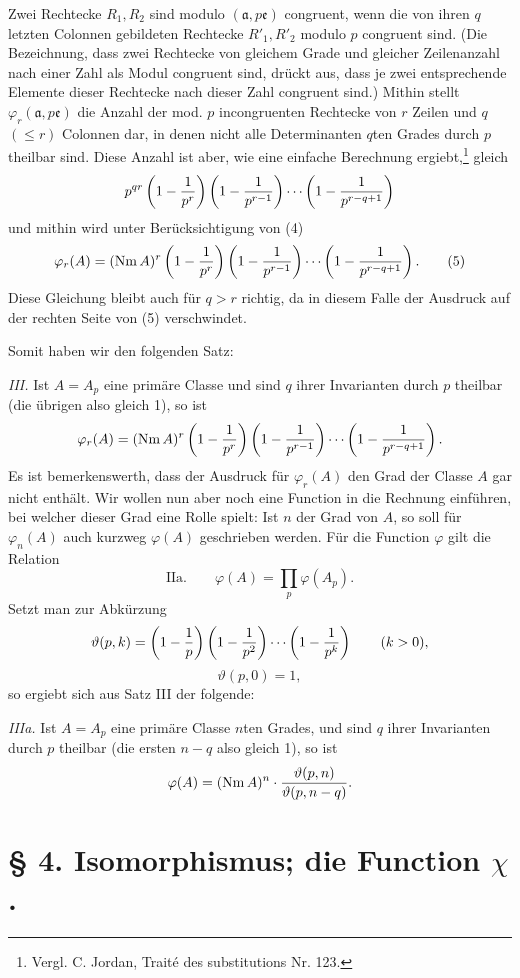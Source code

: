 \documentclass[11pt,a4paper]{article}
\newcommand{\Nm}{\operatorname{Nm}}
\newcommand{\tht}{\vartheta}
\begin{document}
Zwei Rechtecke $R_1,R_2$ sind modulo $(\mathfrak a,p\mathfrak e)$ congruent, wenn die von ihren $q$ letzten Colonnen gebildeten Rechtecke $R'_1,R'_2$ modulo $p$ congruent sind. (Die Bezeichnung, dass zwei Rechtecke von gleichem Grade und gleicher Zeilenanzahl nach einer Zahl als Modul congruent sind, drückt aus, dass je zwei entsprechende Elemente dieser Rechtecke nach dieser Zahl congruent sind.) Mithin stellt $\varphi_r(\mathfrak a,p\mathfrak e)$ die Anzahl der mod. $p$ incongruenten Rechtecke von $r$ Zeilen und $q$ $(\le r)$ Colonnen dar, in denen nicht alle Determinanten $q$ten Grades durch $p$ theilbar sind. Diese Anzahl ist aber, wie eine einfache Berechnung ergiebt,\footnote{Vergl. C. Jordan, Traité des substitutions Nr. 123.} gleich
\[
 p^{qr}\left(1-{1\over p^r}\right)
 \left(1-{1\over p^{r-1}}\right)
 \cdots
 \left(1-{1\over p^{r-q+1}}\right)
\]
und mithin wird unter Berücksichtigung von (4)
\begin{equation}
 \varphi_r(A)=(\Nm A)^r
 \left(1-{1\over p^r}\right)
 \left(1-{1\over p^{r-1}}\right)
 \cdots
 \left(1-{1\over p^{r-q+1}}\right).
\tag{5}
\end{equation}
Diese Gleichung bleibt auch für $q>r$ richtig, da in diesem Falle der Ausdruck auf der rechten Seite von (5) verschwindet.

Somit haben wir den folgenden Satz:

\emph{III.} Ist $A=A_p$ eine primäre Classe und sind $q$ ihrer Invarianten durch $p$ theilbar (die übrigen also gleich 1), so ist
\[
 \varphi_r(A)=(\Nm A)^r
 \left(1-{1\over p^r}\right)
 \left(1-{1\over p^{r-1}}\right)
 \cdots
 \left(1-{1\over p^{r-q+1}}\right).
\]
Es ist bemerkenswerth, dass der Ausdruck für $\varphi_r(A)$ den Grad der Classe $A$ gar nicht enthält. Wir wollen nun aber noch eine Function in die Rechnung einführen, bei welcher dieser Grad eine Rolle spielt: Ist $n$ der Grad von $A$, so soll für $\varphi_n(A)$ auch kurzweg $\varphi(A)$ geschrieben werden. Für die Function $\varphi$ gilt die Relation
\[
\text{IIa.}\qquad
 \varphi(A)=\prod_p \varphi(A_p).
\]
Setzt man zur Abkürzung
\[
 \tht(p,k)=\left(1-{1\over p}\right)
 \left(1-{1\over p^2}\right)\cdots
 \left(1-{1\over p^k}\right)\qquad (k>0),
\]
\[
 \tht(p,0)=1,
\]
so ergiebt sich aus Satz III der folgende:

\emph{IIIa.} Ist $A=A_p$ eine primäre Classe $n$ten Grades, und sind $q$ ihrer Invarianten durch $p$ theilbar (die ersten $n-q$ also gleich 1), so ist
\[
 \varphi(A)=(\Nm A)^n\cdot {\tht(p,n)\over \tht(p,n-q)}.
\]


\section*{§ 4. Isomorphismus; die Function $\chi$.}
\end{document}
